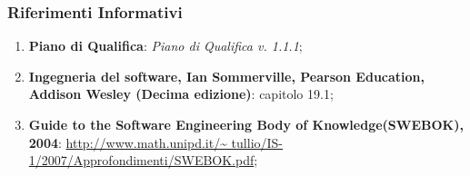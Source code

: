		\subsubsection{Riferimenti Informativi}
			\begin{enumerate}
				\item \textbf{Piano di Qualifica}: \textit{Piano di Qualifica v. 1.1.1};
				\item \textbf{Ingegneria del software, Ian Sommerville, Pearson Education, Addison Wesley (Decima edizione)}: capitolo 19.1;
				\item \textbf{Guide to the Software Engineering Body of Knowledge(SWEBOK), 2004}: \url{http://www.math.unipd.it/~	tullio/IS-1/2007/Approfondimenti/SWEBOK.pdf};
			\end{enumerate}
